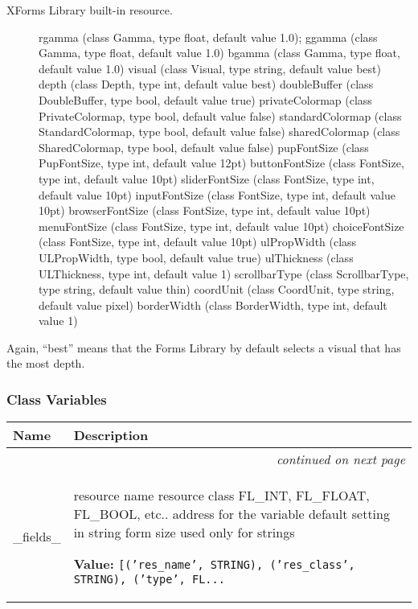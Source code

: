 %
\begin{description}
\item[{XForms Library built-in resource.}] \leavevmode 
rgamma (class Gamma, type float, default value 1.0);
ggamma (class Gamma, type float, default value 1.0)
bgamma (class Gamma, type float, default value 1.0)
visual (class Visual, type string, default value best)
depth (class Depth, type int, default value best)
doubleBuffer (class DoubleBuffer, type bool, default value true)
privateColormap (class PrivateColormap, type bool, default value false)
standardColormap (class StandardColormap, type bool, default value false)
sharedColormap (class SharedColormap, type bool, default value false)
pupFontSize (class PupFontSize, type int, default value 12pt)
buttonFontSize (class FontSize, type int, default value 10pt)
sliderFontSize (class FontSize, type int, default value 10pt)
inputFontSize (class FontSize, type int, default value 10pt)
browserFontSize (class FontSize, type int, default value 10pt)
menuFontSize (class FontSize, type int, default value 10pt)
choiceFontSize (class FontSize, type int, default value 10pt)
ulPropWidth (class ULPropWidth, type bool, default value true)
ulThickness (class ULThickness, type int, default value 1)
scrollbarType (class ScrollbarType, type string, default value thin)
coordUnit (class CoordUnit, type string, default value pixel)
borderWidth (class BorderWidth, type int, default value 1)

\end{description}

Again, ``best'' means that the Forms Library by default selects a visual
that has the most depth.


  \subsubsection{Class Variables}

    \vspace{-1cm}
\hspace{\varindent}\begin{longtable}{|p{\varnamewidth}|p{\vardescrwidth}|l}
\cline{1-2}
\cline{1-2} \centering \textbf{Name} & \centering \textbf{Description}& \\
\cline{1-2}
\endhead\cline{1-2}\multicolumn{3}{r}{\small\textit{continued on next page}}\\\endfoot\cline{1-2}
\endlastfoot\raggedright \_\-f\-i\-e\-l\-d\-s\-\_\- & \raggedright resource name
resource class
FL\_INT, FL\_FLOAT, FL\_BOOL, etc..
address for the variable
default setting in string form
size used only for strings

\textbf{Value:} 
{\tt [('res\_name', STRING), ('res\_class', STRING), ('type', FL\texttt{...}}&\\
\cline{1-2}
\end{longtable}

